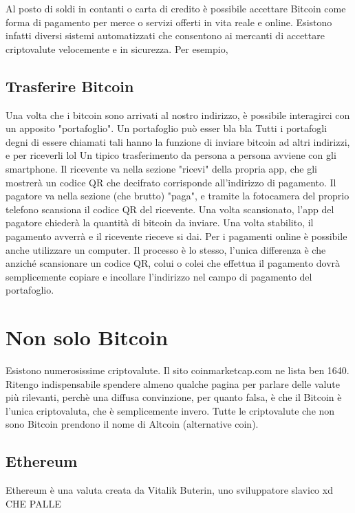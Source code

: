 \documentclass {article}
\begin{document}
Al posto di soldi in contanti o carta di credito è possibile accettare Bitcoin come forma di pagamento per merce o servizi offerti in vita reale e online.
Esistono infatti diversi sistemi automatizzati che consentono ai mercanti di accettare criptovalute velocemente e in sicurezza.
Per esempio, 


\subsection {Trasferire Bitcoin}


Una volta che i bitcoin sono arrivati al nostro indirizzo, è possibile interagirci con un apposito "portafoglio". Un portafoglio può esser bla bla
Tutti i portafogli degni di essere chiamati tali hanno la funzione di inviare bitcoin ad altri indirizzi, e per riceverli lol
Un tipico trasferimento da persona a persona avviene con gli smartphone.
Il ricevente va nella sezione "ricevi" della propria app, che gli mostrerà un codice QR che decifrato corrisponde all'indirizzo di pagamento.
Il pagatore va nella sezione (che brutto) "paga", e tramite la fotocamera del proprio telefono scansiona il codice QR del ricevente.
Una volta scansionato, l'app del pagatore chiederà la quantità di bitcoin da inviare. Una volta stabilito, il pagamento avverrà e il ricevente rieceve si dai.
Per i pagamenti online è possibile anche utilizzare un computer. Il processo è lo stesso, l'unica differenza è che anziché scansionare un codice QR, colui o colei che effettua il pagamento dovrà semplicemente copiare e incollare l'indirizzo nel campo di pagamento del portafoglio.


\section {Non solo Bitcoin}


Esistono numerosissime criptovalute. Il sito coinmarketcap.com ne lista ben 1640. Ritengo indispensabile spendere almeno qualche pagina per parlare delle valute più rilevanti, perchè una diffusa convinzione, per quanto falsa, è che il Bitcoin è l'unica criptovaluta, che è semplicemente invero. Tutte le criptovalute che non sono Bitcoin prendono il nome di Altcoin (alternative coin).


\subsection {Ethereum}


Ethereum è una valuta creata da Vitalik Buterin, uno sviluppatore slavico xd CHE PALLE
\end{document}
